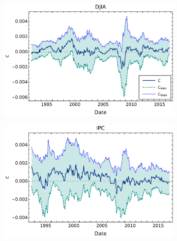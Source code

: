 \documentclass{elsarticle}
\begin{document}
\begin{figure}[h!tb]
        \centering
        \begin{subfigure}[b]{0.44\textwidth}
            \centering
            \includegraphics[width=\textwidth]{figures/SimmTVReturns/Simetria_DJIA_CL005.pdf}
            \label{fig:SymmTVReturns005DJIA}
        \end{subfigure}
        \quad
        \begin{subfigure}[b]{0.44\textwidth}
            \centering 
            \includegraphics[width=\textwidth]{figures/SimmTVReturns/Simetria_IPC_CL005.pdf}
            \label{fig:SymmTVReturns005IPC}
        \end{subfigure}
        \begin{subfigure}[b]{0.44\textwidth}
            \centering 

\end{subfigure}
\end{figure}
\end{document}
